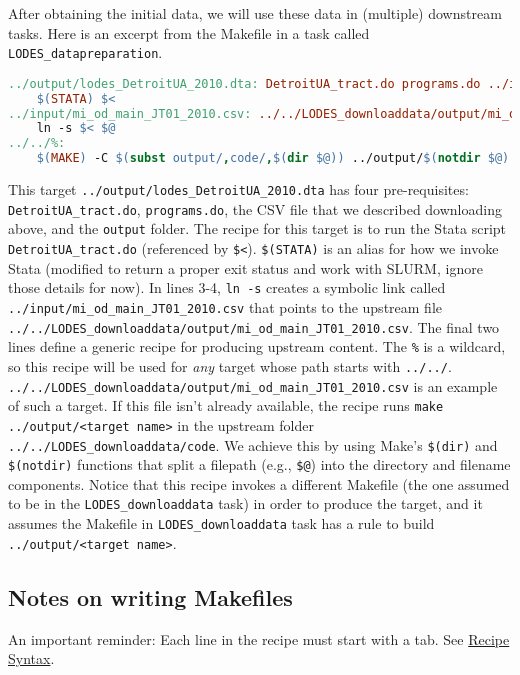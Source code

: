 After obtaining the initial data, we will use these data in (multiple) downstream tasks.
Here is an excerpt from the Makefile in a task called \texttt{LODES\_datapreparation}.
\begin{lstlisting}[language=make]
../output/lodes_DetroitUA_2010.dta: DetroitUA_tract.do programs.do ../input/mi_od_main_JT01_2010.csv | ../output
	$(STATA) $<
../input/mi_od_main_JT01_2010.csv: ../../LODES_downloaddata/output/mi_od_main_JT01_2010.csv | ../input
	ln -s $< $@
../../%:
	$(MAKE) -C $(subst output/,code/,$(dir $@)) ../output/$(notdir $@)
\end{lstlisting}
This target \texttt{../output/lodes\_DetroitUA\_2010.dta} has four pre-requisites:
\texttt{DetroitUA\_tract.do}, \texttt{programs.do}, the CSV file that we described downloading above, and the \texttt{output} folder.
The recipe for this target is to run the Stata script \texttt{DetroitUA\_tract.do} (referenced by \texttt{\$<}).
\texttt{\$(STATA)} is an alias for how we invoke Stata
(modified to return a proper exit status and work with SLURM, ignore those details for now).
In lines 3-4, \texttt{ln -s} creates a symbolic link called \texttt{../input/mi\_od\_main\_JT01\_2010.csv} that points to the upstream file
\texttt{../../LODES\_downloaddata/output/mi\_od\_main\_JT01\_2010.csv}.
The final two lines define a generic recipe for producing upstream content.
The \texttt{\%} is a wildcard, so this recipe will be used for \textit{any} target whose path starts with \texttt{../../}.
\texttt{../../LODES\_downloaddata/output/mi\_od\_main\_JT01\_2010.csv} is an example of such a target.
If this file isn't already available,
the recipe runs \texttt{make ../output/<target name>} in the upstream folder 
\texttt{../../LODES\_downloaddata/code}.
We achieve this by using Make's \texttt{\$(dir)} and \texttt{\$(notdir)} functions that split a filepath (e.g., \texttt{\$@}) into the directory and filename components.
Notice that this recipe invokes a different Makefile (the one assumed to be in the \texttt{LODES\_downloaddata} task)
in order to produce the target,
and it assumes the Makefile in \texttt{LODES\_downloaddata} task has a rule to build \texttt{../output/<target name>}.

\subsection{Notes on writing Makefiles}

An important reminder: Each line in the recipe must start with a tab.
See \href{https://www.gnu.org/software/make/manual/html_node/Recipe-Syntax.html}{Recipe Syntax}.

